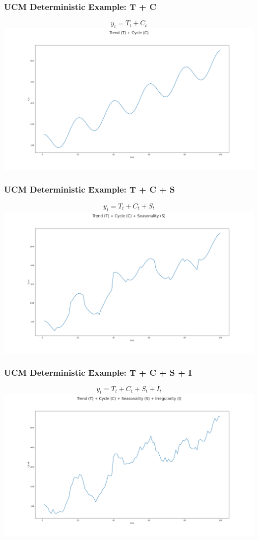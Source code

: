 \documentclass{beamer}
\begin{document}
\begin{frame}[t]\frametitle{UCM Deterministic Example: T + C}
\[y_{t} = T_{t}+C_{t}\]
\includegraphics[width=\textwidth, height=0.7\textheight]{ucm_deterministic_trend_cycle}
\end{frame}

\begin{frame}[t]\frametitle{UCM Deterministic Example: T + C + S}
\[y_{t} = T_{t}+C_{t}+S_{t}\]
\includegraphics[width=\textwidth, height=0.7\textheight]{ucm_deterministic_trend_cycle_season}
\end{frame}

\begin{frame}[t]\frametitle{UCM Deterministic Example: T + C + S + I}
\[y_{t} = T_{t}+C_{t}+S_{t}+I_{t}\]
\includegraphics[width=\textwidth, height=0.7\textheight]{ucm_deterministic_full_model}
\end{frame}
\end{document}
